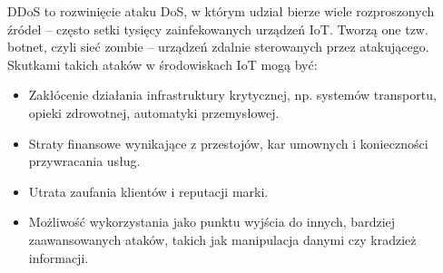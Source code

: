 DDoS to rozwinięcie ataku DoS, w którym udział bierze wiele rozproszonych źródeł – często setki tysięcy zainfekowanych urządzeń IoT. Tworzą one tzw. botnet, czyli sieć zombie – urządzeń zdalnie sterowanych przez atakującego.
Skutkami takich ataków w środowiskach IoT mogą być:
\begin{itemize}
    \item Zakłócenie działania infrastruktury krytycznej, np. systemów transportu, opieki zdrowotnej, automatyki przemysłowej.
    \item Straty finansowe wynikające z przestojów, kar umownych i konieczności przywracania usług.
    \item Utrata zaufania klientów i reputacji marki.
    \item Możliwość wykorzystania jako punktu wyjścia do innych, bardziej zaawansowanych ataków, takich jak manipulacja danymi czy kradzież informacji.
\end{itemize}

